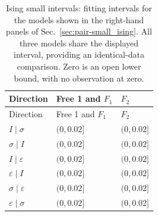 \begingroup\setlength{\tabcolsep}{2pt}
\begin{longtable}{lll}
\caption{Ising small intervals: fitting intervals for the models shown in the right-hand panels of Sec.~\ref{sec:pair-small_ising}. All three models share the displayed interval, providing an identical-data comparison. Zero is an open lower bound, with no observation at zero.}
\label{tab:window-small_ising-ranges}\\\toprule
Direction & Free 1 and $F_1$ & $F_2$\\\midrule
\endfirsthead
\toprule
Direction & Free 1 and $F_1$ & $F_2$\\\midrule
\endhead
\bottomrule\endfoot
$I\mid \sigma$ & $(0,0.02]$ & $(0,0.02]$\\
$\sigma\mid I$ & $(0,0.02]$ & $(0,0.02]$\\
$I\mid \varepsilon$ & $(0,0.02]$ & $(0,0.02]$\\
$\varepsilon\mid I$ & $(0,0.02]$ & $(0,0.02]$\\
$\sigma\mid \varepsilon$ & $(0,0.02]$ & $(0,0.02]$\\
$\varepsilon\mid \sigma$ & $(0,0.02]$ & $(0,0.02]$\\
\end{longtable}
\endgroup
